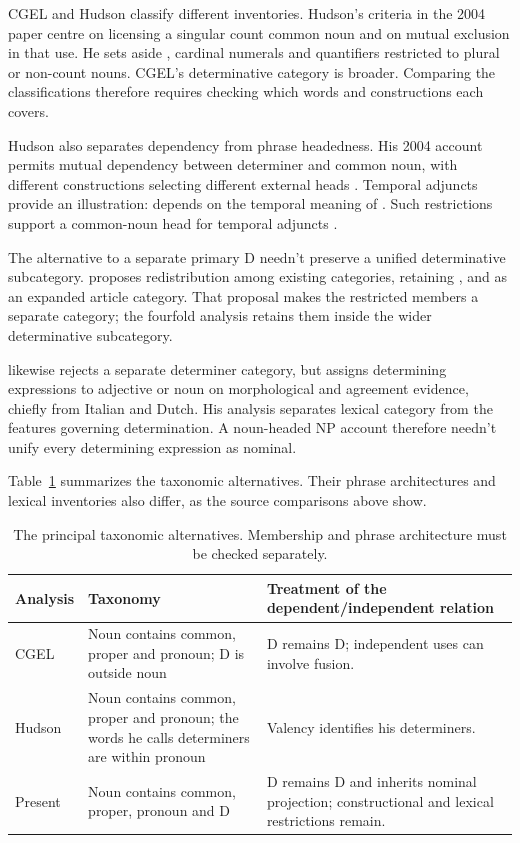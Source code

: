 \documentclass[12pt]{article}
\begin{document}
CGEL and Hudson classify different inventories. Hudson's criteria in the 2004 paper centre on licensing a singular count common noun and on mutual exclusion in that use. He sets aside , cardinal numerals and quantifiers restricted to plural or non-count nouns. CGEL's determinative category is broader. Comparing the classifications therefore requires checking which words and constructions each covers.

Hudson also separates dependency from phrase headedness. His 2004 account permits mutual dependency between determiner and common noun, with different constructions selecting different external heads \citep[7--9]{hudson2004determiners}. Temporal adjuncts provide an illustration:  depends on the temporal meaning of . Such restrictions support a common-noun head for temporal adjuncts \citep[10--12]{hudson2004determiners}.

The alternative to a separate primary D needn't preserve a unified determinative subcategory. \textcite{spinillo2004reconceptualising} proposes redistribution among existing categories, retaining ,  and  as an expanded article category. That proposal makes the restricted members a separate category; the fourfold analysis retains them inside the wider determinative subcategory.

\textcite{vaneynde2003determiner} likewise rejects a separate determiner category, but assigns determining expressions to adjective or noun on morphological and agreement evidence, chiefly from Italian and Dutch. His analysis separates lexical category from the features governing determination. A noun-headed NP account therefore needn't unify every determining expression as nominal.

Table~\ref{tab:rivals} summarizes the taxonomic alternatives. Their phrase architectures and lexical inventories also differ, as the source comparisons above show.

\begin{table}[tb]
\centering\small
\caption{The principal taxonomic alternatives. Membership and phrase architecture must be checked separately.}\label{tab:rivals}
\begin{tabular}{>{\raggedright\arraybackslash}p{2.1cm}>{\raggedright\arraybackslash}p{4.5cm}>{\raggedright\arraybackslash}p{5.1cm}}
\toprule
Analysis & Taxonomy & Treatment of the dependent/independent relation \\
\midrule
CGEL & Noun contains common, proper and pronoun; D is outside noun & D remains D; independent uses can involve fusion. \\
Hudson & Noun contains common, proper and pronoun; the words he calls determiners are within pronoun & Valency identifies his determiners. \\
Present & Noun contains common, proper, pronoun and D & D remains D and inherits nominal projection; constructional and lexical restrictions remain. \\
\bottomrule
\end{tabular}
\end{table}
\end{document}
